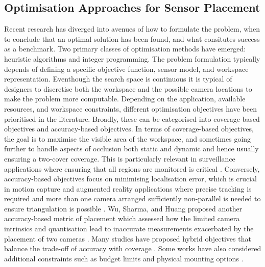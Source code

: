 \subsection{Optimisation Approaches for Sensor Placement}
Recent research has diverged into avenues of how to formulate the problem, when to conclude that an optimal solution has been found, and what consitutes success as a benchmark. Two primary classes of optimisation methods have emerged: heuristic algorithms and integer programming. The problem formulation typically depends of defining a specific objective function, sensor model, and workspace representation. Eventhough the search space is continuous it is typical of designers to discretise both the workspace and the possible camera locations to make the problem more computable. Depending on the application, available resources, and workspace constraints, different optimisation objectives have been prioritised in the literature. Broadly, these can be categorised into coverage-based objectives and accuracy-based objectives. In terms of coverage-based objectives, the goal is to maximise the visible area of the workspace, and sometimes going further to handle aspects of occlusion both static and dynamic and hence usually ensuring a two-cover coverage. This is particularly relevant in surveillance applications where ensuring that all regions are monitored is critical \parencite{bodorOptimalCameraPlacement2007}. Conversely, accuracy-based objectives focus on minimising localisation error, which is crucial in motion capture and augmented reality applications where precise tracking is required and more than one camera arranged sufficiently non-parallel is needed to ensure triangulation is possible \parencite{aissaouiDesigningCameraPlacement2018, rahimianOptimalCameraPlacement2017}. Wu, Sharma, and Huang proposed another accuracy-based metric of placement which assessed how the limited camera intrinsics and quantisation lead to inaccurate measurements exacerbated by the placement of two cameras \parencite{sharmaAnalysisUncertaintyBounds1998}. Many studies have proposed hybrid objectives that balance the trade-off of accuracy with coverage \parencite{zieglerOptimalCameraPlacement2023, zhouSensorPlacementOptimization2024}. Some works have also considered additional constraints such as budget limits and physical mounting options \parencite{aissaouiDesigningCameraPlacement2018, puligandlaMultiresolutionApproachLarge2022, daiOptimalCameraConfiguration}.

